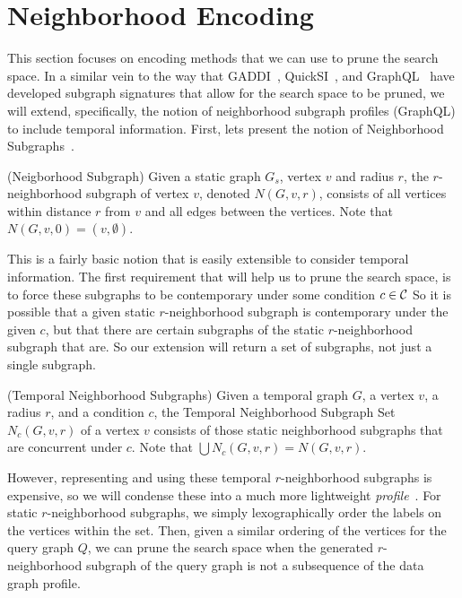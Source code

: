 \section{Neighborhood Encoding}
\label{ref:encoding}

This section focuses on encoding methods that we can use to prune the search
space. In a similar vein to the way that GADDI~\cite{2009-EDBT-GADDI},
QuickSI~\cite{2008-VLDB-QuickSI}, and GraphQL~\cite{2008-SIGMOD-GraphQL} have
developed subgraph signatures that allow for the search space to be pruned, we
will extend, specifically, the notion of neighborhood subgraph profiles
(GraphQL) to include temporal information. First, lets present the notion of
Neighborhood Subgraphs~\cite{2008-SIGMOD-GraphQL}.

\begin{defn}
  (Neigborhood Subgraph) Given a static graph $G_s$, vertex $v$ and radius $r$,
  the $r$-neighborhood subgraph of vertex $v$, denoted $N(G,v,r)$, consists of
  all vertices within distance $r$ from $v$ and all edges between the
  vertices. Note that $N(G,v,0) = ({v}, \emptyset)$.
\end{defn}

This is a fairly basic notion that is easily extensible to consider temporal
information. The first requirement that will help us to prune the search space,
is to force these subgraphs to be contemporary under some condition $c \in \mathcal{C}$
So it is possible that a given static $r$-neighborhood subgraph is contemporary under the
given $c$, but that there are certain subgraphs of the static $r$-neighborhood
subgraph that are.  So our extension will return a set of subgraphs, not just a
single subgraph.

\begin{defn}
  (Temporal Neighborhood Subgraphs) Given a temporal graph $G$, a vertex $v$, a
  radius $r$, and a condition $c$, the Temporal Neighborhood Subgraph Set
  $N_c(G,v,r)$ of a vertex $v$ consists of those static neighborhood subgraphs
  that are concurrent under $c$. Note that $\displaystyle\bigcup N_c(G,v,r) =
  N(G,v,r)$.
\end{defn}

However, representing and using these temporal $r$-neighborhood subgraphs is
expensive, so we will condense these into a much more lightweight
\textit{profile}~\cite{2008-SIGMOD-GraphQL}. For static $r$-neighborhood
subgraphs, we simply lexographically order the labels on the vertices within the
set. Then, given a similar ordering of the vertices for the query graph $Q$, we
can prune the search space when the generated $r$-neighborhood subgraph of the
query graph is not a subsequence of the data graph profile.

